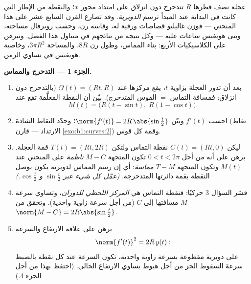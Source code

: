 \begin{problem}\label{pb:b1:curves:1}
عجلة نصف قطرها $R$ تتدحرج دون انزلاق على امتداد محور $x$؛
والنقطة من الإطار التي كانت في البداية عند المبدأ ترسم
\emph{الدويرية}. وقد تصارع القرن السابع عشر على هذا المنحني
--- فوزن غاليليو قصاصات ورقية له، وقاسه رن،
وحسب روبرفال مساحته، وبنى هويغنس ساعات عليه ---
وكل نتيجة من نتائجهم في متناول هذا الفصل. ونبرهن
على الكلاسيكيات الأربع: بناء المماس، وطول رن
$8R$، والمساحة $3\pi R^2$، وخاصية هويغنس في
تساوي الزمن.

\medskip
\noindent\textbf{الجزء 1 --- التدحرج والمماس.}
\begin{enumerate}
  \item بعد أن تدور العجلة بزاوية $t$، يقع مركزها
        عند $\Omega(t) = (Rt, R)$ (بالتدحرج دون انزلاق:
        فمسافة التماس $=$ القوس المتدحرج). بيّن أن النقطة
        المعلَّمة تقع عند
        \[
        M(t) = \bigl(R(t - \sin t),\; R(1 - \cos t)\bigr).
        \]
  \item احسب $f'(t)$ وبيّن $\norm{f'(t)} =
        2R\,\abs{\sin\frac t2}$؛ وحدّد النقاط الشاذة
        (نقاط الارتداد --- قارن \cref{exo:b1:curves:2}) وقمة
        كل قوس.
  \item ليكن $C(t) = (Rt, 0)$ نقطة التماس ولتكن $T(t) =
        (Rt, 2R)$ قمة العجلة. برهن على أنه من أجل $0 < t <
        2\pi$ تكون المتجهة $M - C$ \emph{ناظمة} على المنحني عند
        $M(t)$ وتكون المتجهة $T - M$ \emph{مماسة}: أي إن رسم
        المماس لدويرية يكون بوصل النقطة بقمة
        دائرتها المتدحرجة. \emph{(عمّل كل شيء عبر
        $\sin\frac t2$ و $\cos\frac t2$.)}
  \item فسّر السؤال 3 حركيًا: فنقطة التماس هي
        \emph{المركز اللحظي للدوران}، وتساوي سرعة $M$
        مسافتها إلى $C$ (من أجل سرعة زاوية واحدية).
        وتحقق من $\norm{M - C} = 2R\abs{\sin\frac t2}$.
  \item برهن على علاقة الارتفاع والسرعة
        \[
        \norm{f'(t)}^2 = 2R\,y(t) :
        \]
        على دويرية مقطوعة بسرعة زاوية واحدية، تكون
        السرعة عند كل نقطة بالضبط سرعةَ السقوط الحر من أجل
        هبوط يساوي الارتفاع الحالي. (احتفظ بهذا من أجل
        الجزء 4.)
\end{enumerate}


\end{problem}
